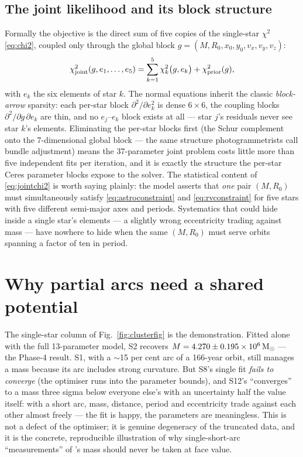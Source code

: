 \subsection{The joint likelihood and its block structure}

Formally the objective is the direct sum of five copies of the
single-star $\chi^2$ \eqref{eq:chi2}, coupled only through the global
block $g = (M, R_0, x_0, y_0, v_x, v_y, v_z)$:
\begin{equation}
\chi^2_{\rm joint}(g, e_1, \dots, e_5)
= \sum_{k=1}^{5} \chi^2_k\bigl(g, e_k\bigr) + \chi^2_{\rm prior}(g),
\label{eq:jointchi2}
\end{equation}
with $e_k$ the six elements of star $k$. The normal equations inherit
the classic \emph{block-arrow} sparsity: each per-star block
$\partial^2/\partial e_k^2$ is dense $6\times6$, the coupling blocks
$\partial^2/\partial g\,\partial e_k$ are thin, and no
$e_j$--$e_k$ block exists at all — star $j$'s residuals never see star
$k$'s elements. Eliminating the per-star blocks first (the Schur
complement onto the 7-dimensional global block — the same structure
photogrammetrists call bundle adjustment) means the 37-parameter joint
problem costs little more than five independent fits per iteration,
and it is exactly the structure the per-star Ceres parameter blocks
expose to the solver. The statistical content of \eqref{eq:jointchi2}
is worth saying plainly: the model asserts that \emph{one} pair
$(M, R_0)$ must simultaneously satisfy \eqref{eq:astroconstraint} and
\eqref{eq:rvconstraint} for five stars with five different semi-major
axes and periods. Systematics that could hide inside a single star's
elements — a slightly wrong eccentricity trading against mass — have
nowhere to hide when the same $(M, R_0)$ must serve orbits spanning a
factor of ten in period.

\section{Why partial arcs need a shared potential}
\label{sec:partialarc}

The single-star column of Fig.~\ref{fig:clusterfig} is the
demonstration. Fitted alone with the full 13-parameter model, S2
recovers $M = 4.270 \pm 0.195 \times10^6\,\mathrm{M}_\odot$ —
the Phase-4 result. S1, with a $\sim$15 per cent arc of a 166-year
orbit, still manages a mass because its arc includes strong curvature.
But S8's single fit \emph{fails to converge} (the optimiser runs into
the parameter bounds), and S12's ``converges'' to a mass three sigma
below everyone else's with an uncertainty half the value itself: with a
short arc, mass, distance, period and eccentricity trade against each
other almost freely — the fit is happy, the parameters are meaningless.
This is not a defect of the optimiser; it is genuine degeneracy of the
truncated data, and it is the concrete, reproducible illustration of why
single-short-arc ``measurements'' of \sgra's mass should never be taken
at face value.

